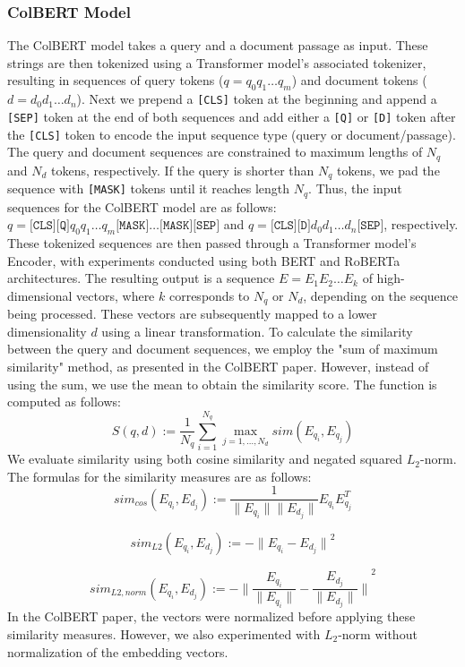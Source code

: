 \documentclass{article}
\begin{document}
\subsubsection{ColBERT Model}
The ColBERT model takes a query and a document passage as input. These strings are then tokenized using a Transformer model's associated tokenizer, resulting in sequences of query tokens ($q = q_0q_1\dots q_m$) and document tokens ($d = d_0d_1\dots d_n$). Next we prepend a \texttt{[CLS]} token at the beginning and append a \texttt{[SEP]} token at the end of both sequences and add either a \texttt{[Q]} or \texttt{[D]} token after the \texttt{[CLS]} token to encode the input sequence type (query or document/passage). The query and document sequences are constrained to maximum lengths of $N_q$ and $N_d$ tokens, respectively. If the query is shorter than $N_q$ tokens, we pad the sequence with \texttt{[MASK]} tokens until it reaches length $N_q$. Thus, the input sequences for the ColBERT model are as follows: $q = \texttt{[CLS]}\texttt{[Q]}q_0q_1 \dots q_m\texttt{[MASK]}\dots\texttt{[MASK]}\texttt{[SEP]}$ and $q = \texttt{[CLS]}\texttt{[D]}d_0d_1 \dots d_n\texttt{[SEP]}$, respectively. These tokenized sequences are then passed through a Transformer model's Encoder, with experiments conducted using both BERT \cite{devlin2019bert} and RoBERTa \cite{liu2019roberta} architectures. The resulting output is a sequence $E = E_1E_2 \dots E_k$ of high-dimensional vectors, where $k$ corresponds to $N_q$ or $N_d$, depending on the sequence being processed. These vectors are subsequently mapped to a lower dimensionality $d$ using a linear transformation. To calculate the similarity between the query and document sequences, we employ the "sum of maximum similarity" method, as presented in the ColBERT paper. However, instead of using the sum, we use the mean to obtain the similarity score. The function is computed as follows:
$$ S(q,d) := \frac{1}{N_q} \sum_{i=1}^{N_q} \max_{j = 1, \dots, N_d} sim(E_{q_i}, E_{q_j})
$$
We evaluate similarity using both cosine similarity and negated squared $L_2$-norm. The formulas for the similarity measures are as follows:
$$
sim_{cos}(E_{q_i}, E_{d_j}) := \frac{1}{\| E_{q_i} \|\| E_{d_j} \|} E_{q_i}E_{q_j}^T 
$$

$$
sim_{L2}(E_{q_i}, E_{d_j}) := -{\| E_{q_i} -E_{d_j} \|}^2
$$

$$
sim_{L2,norm}(E_{q_i}, E_{d_j}) := -{\| \frac{E_{q_i}}{\| E_{q_i} \|}  - \frac{E_{d_j}}{\| E_{d_j} \|} \|}^2
$$
In the ColBERT paper, the vectors were normalized before applying these similarity measures. However, we also experimented with $L_2$-norm without normalization of the embedding vectors.
\end{document}
